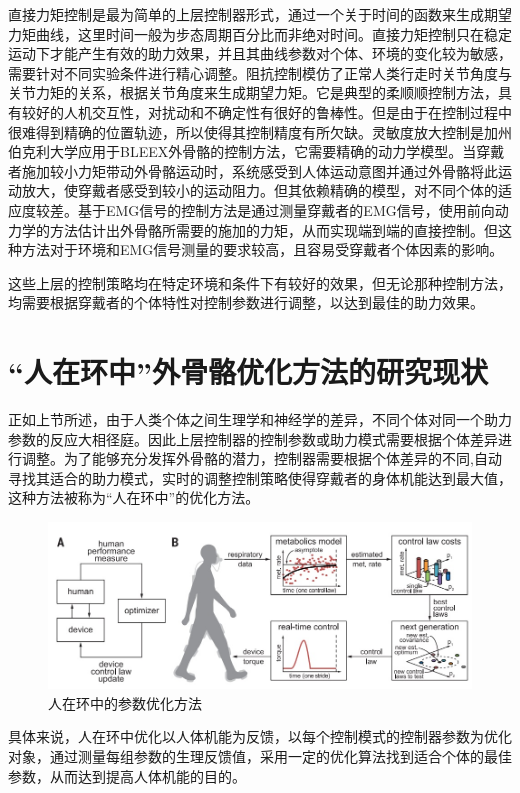 直接力矩控制是最为简单的上层控制器形式，通过一个关于时间的函数来生成期望力矩曲线\cite{p32,p33}，这里时间一般为步态周期百分比而非绝对时间。直接力矩控制只在稳定运动下才能产生有效的助力效果，并且其曲线参数对个体、环境的变化较为敏感，需要针对不同实验条件进行精心调整。阻抗控制模仿了正常人类行走时关节角度与关节力矩的关系，根据关节角度来生成期望力矩\cite{p34}。它是典型的柔顺顺控制方法，具有较好的人机交互性，对扰动和不确定性有很好的鲁棒性。但是由于在控制过程中很难得到精确的位置轨迹，所以使得其控制精度有所欠缺。灵敏度放大控制是加州伯克利大学应用于BLEEX外骨骼的控制方法\cite{p35}，它需要精确的动力学模型。当穿戴者施加较小力矩带动外骨骼运动时，系统感受到人体运动意图并通过外骨骼将此运动放大，使穿戴者感受到较小的运动阻力。但其依赖精确的模型，对不同个体的适应度较差。基于EMG信号的控制方法是通过测量穿戴者的EMG信号，使用前向动力学的方法估计出外骨骼所需要的施加的力矩，从而实现端到端的直接控制\cite{p36}。但这种方法对于环境和EMG信号测量的要求较高，且容易受穿戴者个体因素的影响。

这些上层的控制策略均在特定环境和条件下有较好的效果，但无论那种控制方法，均需要根据穿戴者的个体特性对控制参数进行调整，以达到最佳的助力效果。

\section{“人在环中”外骨骼优化方法的研究现状}

正如上节所述，由于人类个体之间生理学和神经学的差异，不同个体对同一个助力参数的反应大相径庭\cite{p37}。因此上层控制器的控制参数或助力模式需要根据个体差异进行调整。为了能够充分发挥外骨骼的潜力，控制器需要根据个体差异的不同,自动寻找其适合的助力模式，实时的调整控制策略使得穿戴者的身体机能达到最大值，这种方法被称为“人在环中”的优化方法\cite{p38}。
\begin{figure}[!htb]
    \includegraphics[width=15cm]{fig/f18.jpg}
    \caption{人在环中的参数优化方法\cite{p40}}
    \label{fig:mark}
\end{figure}

具体来说，人在环中优化以人体机能为反馈，以每个控制模式的控制器参数为优化对象，通过测量每组参数的生理反馈值，采用一定的优化算法找到适合个体的最佳参数，从而达到提高人体机能的目的。

